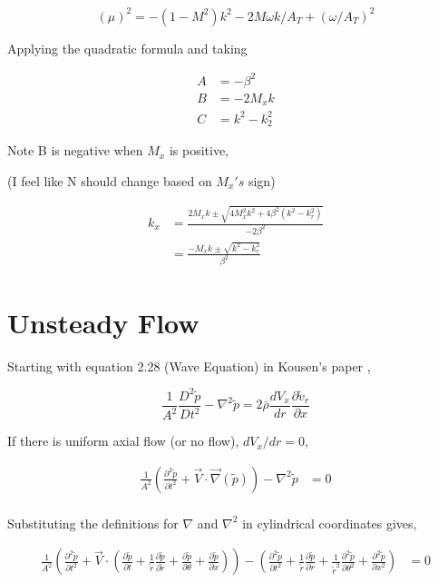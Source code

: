\documentclass[a4paper]{article}
\begin{document}
\begin{equation}
    (\mu )^2 = -(1 - M^2) k^2 - 2 M \omega k / A_T + \left( \omega/A_T \right)^2
    \label{<+label+>}
\end{equation}



Applying the quadratic formula and taking 

\begin{align*}
    A &= - \beta^2 \\
    B &= - 2M_x k\\
    C &= k^2 - k_2^2
\end{align*} 

Note B is negative when $M_x$ is positive,

(I feel like N should change based on $M_x's$ sign)

\begin{align*}
    k_x &= \frac{2M_x k \pm \sqrt{4 M_x^2 k^2 + 4 \beta^2 \left( k^2 - k_r^2 \right)}}{-2\beta^2}\\
        &= \frac{-M_x k \pm \sqrt{k^2 - k_r^2}}{\beta^2}
\end{align*}
\section{Unsteady Flow}





Starting with equation 2.28 (Wave Equation) in Kousen's paper \cite{Kousen1999},



\begin{equation}
    \frac{1}{A^2}\frac{D^2\tilde{p}}{Dt^2} -
    \nabla^2 \tilde{p} =
    2 \bar{\rho} \frac{d V_x}{d r} \frac{\partial  \tilde{v}_r}{ \partial x} 
    \label{eqn:KousensWaveEquation}
\end{equation}

If there is uniform axial flow (or no flow), $dV_x/dr = 0$,

\begin{align*}
    \frac{1}{A^2}\left(
        \frac{\partial^2 \tilde{p}}{\partial t^2} + 
        \vec{V}\cdot \vec {\nabla} (\tilde{p}) 
    \right) -
    \nabla^2
    \tilde{p} &=
    0 \\
\end{align*}

Substituting the definitions for $\nabla$ and $\nabla^2$ in cylindrical 
coordinates gives,

\begin{align*} 
    \frac{1}{A^2}\left(
        \frac{\partial^2 \tilde{p}}{\partial t^2}
    + 
        \vec{V}\cdot \left(
            \frac{\partial\tilde{p}}{\partial t} + 
            \frac{1}{\tilde{r}}\frac{\partial \tilde{p} }{\partial \tilde{r}} +
            \frac{\partial \tilde{p}}{\partial \theta} +
            \frac{\partial \tilde{p}}{\partial x}  
        \right)  \right)-
        \left(
            \frac{\partial^2 \tilde{p}}{\partial t^2} + 
            \frac{1}{\tilde{r}}\frac{\partial \tilde{p}}{\partial r} +
            \frac{1}{\tilde{r}^2} \frac{\partial^2 \tilde{p}}{\partial \theta^2} + 
            \frac{\partial^2 \tilde{p}}{\partial x^2} 
        \right) &= 0  
\end{align*} 
\end{document}
